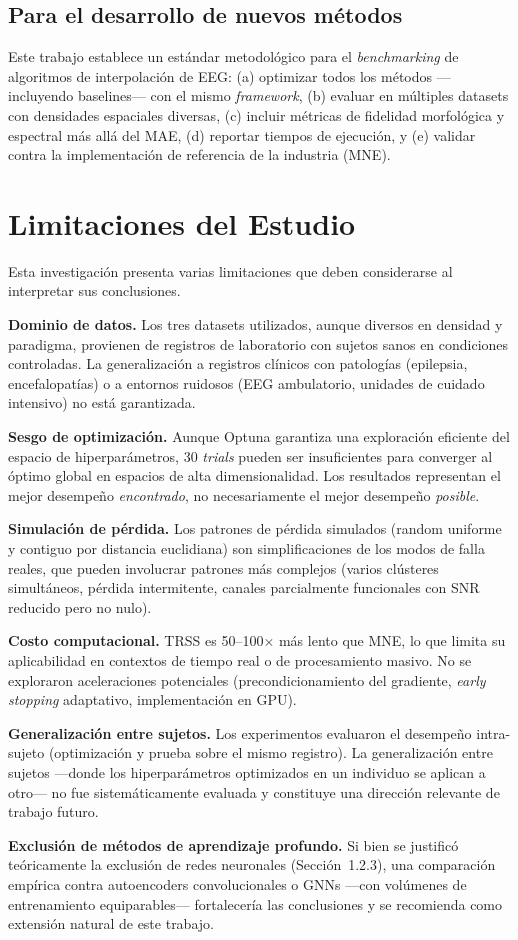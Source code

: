 \subsection{Para el desarrollo de nuevos métodos}

Este trabajo establece un estándar metodológico para el \textit{benchmarking} de algoritmos de interpolación de EEG: (a) optimizar todos los métodos —incluyendo baselines— con el mismo \textit{framework}, (b) evaluar en múltiples datasets con densidades espaciales diversas, (c) incluir métricas de fidelidad morfológica y espectral más allá del MAE, (d) reportar tiempos de ejecución, y (e) validar contra la implementación de referencia de la industria (MNE).

\section{Limitaciones del Estudio}

Esta investigación presenta varias limitaciones que deben considerarse al interpretar sus conclusiones.

\textbf{Dominio de datos.} Los tres datasets utilizados, aunque diversos en densidad y paradigma, provienen de registros de laboratorio con sujetos sanos en condiciones controladas. La generalización a registros clínicos con patologías (epilepsia, encefalopatías) o a entornos ruidosos (EEG ambulatorio, unidades de cuidado intensivo) no está garantizada.

\textbf{Sesgo de optimización.} Aunque Optuna garantiza una exploración eficiente del espacio de hiperparámetros, 30 \textit{trials} pueden ser insuficientes para converger al óptimo global en espacios de alta dimensionalidad. Los resultados representan el mejor desempeño \textit{encontrado}, no necesariamente el mejor desempeño \textit{posible}.

\textbf{Simulación de pérdida.} Los patrones de pérdida simulados (random uniforme y contiguo por distancia euclidiana) son simplificaciones de los modos de falla reales, que pueden involucrar patrones más complejos (varios clústeres simultáneos, pérdida intermitente, canales parcialmente funcionales con SNR reducido pero no nulo).

\textbf{Costo computacional.} TRSS es 50--100$\times$ más lento que MNE, lo que limita su aplicabilidad en contextos de tiempo real o de procesamiento masivo. No se exploraron aceleraciones potenciales (precondicionamiento del gradiente, \textit{early stopping} adaptativo, implementación en GPU).

\textbf{Generalización entre sujetos.} Los experimentos evaluaron el desempeño intra-sujeto (optimización y prueba sobre el mismo registro). La generalización entre sujetos —donde los hiperparámetros optimizados en un individuo se aplican a otro— no fue sistemáticamente evaluada y constituye una dirección relevante de trabajo futuro.

\textbf{Exclusión de métodos de aprendizaje profundo.} Si bien se justificó teóricamente la exclusión de redes neuronales (Sección~1.2.3), una comparación empírica contra autoencoders convolucionales o GNNs —con volúmenes de entrenamiento equiparables— fortalecería las conclusiones y se recomienda como extensión natural de este trabajo.
